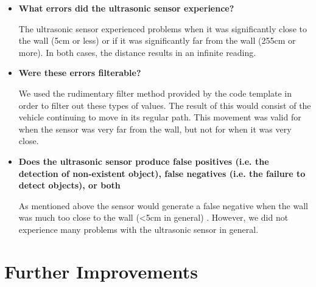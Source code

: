 \documentclass[paper=a4, fontsize=11pt]{scrartcl}
\begin{document}
\begin{itemize}

  \item \textbf{What errors did the ultrasonic sensor experience?}
  
  The ultrasonic sensor experienced problems when it was significantly close to the wall (5cm or less) or if it was significantly far from the wall (255cm or more). In both cases, the distance results in an infinite reading. 
  
  \item \textbf{Were these errors filterable?}
  
  We used the rudimentary filter method provided by the code template in order to filter out these types of values. The result of this would consist of the vehicle continuing to move in its regular path. This movement was valid for when the sensor was very far from the wall, but not for when it was very close.
  
  \item \textbf{Does the ultrasonic sensor produce false positives (i.e. the detection of non-existent object), false negatives (i.e. the failure to detect objects), or both}
  
  As mentioned above the sensor would generate a false negative when the wall was much too close to the wall (<5cm in general) . However, we did not experience many problems with the ultrasonic sensor in general. 
  
\end{itemize}

\section{Further Improvements}
\end{document}
